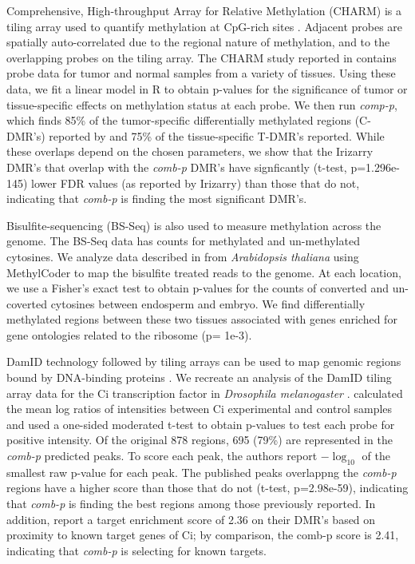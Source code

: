 \documentclass{bioinfo}
\begin{document}
\begin{methods}
Comprehensive, High-throughput Array for Relative Methylation (CHARM)
is a tiling array used to quantify methylation at CpG-rich sites
\citep{Irizarry2008}.  Adjacent probes are spatially auto-correlated
due to the regional nature of methylation, and to the overlapping
probes on the tiling array.  The CHARM study reported in
\cite{Irizarry2009} contains probe data for tumor and normal samples
from a variety of tissues. Using these data, we fit a linear model in R
\citep{R} to
obtain p-values for the significance of tumor or tissue-specific
effects on methylation status at each probe.  We then run
\textit{comp-p}, which finds 85\% of the tumor-specific differentially
methylated regions (C-DMR's) reported by \cite{Irizarry2009} and 75\% of
the tissue-specific T-DMR's reported.  While these overlaps depend on
the chosen parameters, we show that the Irizarry DMR's that overlap
with the \textit{comb-p} DMR's have signficantly (t-test,
p=1.296e-145) lower FDR values (as reported by Irizarry) than those
that do not, indicating that \textit{comb-p} is finding the most
significant DMR's.

Bisulfite-sequencing (BS-Seq) is also used to measure methylation across the
genome. The BS-Seq data
has counts for methylated and un-methylated cytosines.  We
analyze data described in \cite{Hsieh2009} from {\it Arabidopsis
thaliana} using MethylCoder \citep{Pedersen2011} to map the
bisulfite treated reads to the genome. At each location,
we use a Fisher's exact test to obtain p-values for the counts of
converted and un-coverted cytosines between endosperm and embryo. We find
differentially methylated regions between these two tissues associated
with genes enriched for gene ontologies related to the ribosome (p=
1e-3).

DamID technology followed by tiling arrays can be used to map genomic
regions bound by DNA-binding proteins \citep{Steensel2001}.  We
recreate an analysis of the DamID tiling array data for the Ci
transcription factor in {\it Drosophila melanogaster} \citep{Biehs}.
\cite{Kechris2010} calculated the
mean log ratios of intensities between Ci experimental and control
samples and used a one-sided moderated t-test \citep{Limma2005} to obtain
p-values to test each probe for positive intensity.
Of the original 878 regions, 695 (79\%) are
represented in the \textit{comb-p} predicted peaks.  To score each
peak, the authors report $-\log_{10}$ of the smallest raw p-value for
each peak. The published peaks overlappng the \textit{comb-p} regions
have a higher score than those that do not (t-test, p=2.98e-59),
indicating that \textit{comb-p}
is finding the best regions among those previously reported.
In addition,
\cite{Kechris2010} report a target enrichment score of 2.36 on their DMR's
based on proximity to known target genes of Ci; by comparison, the
comb-p score is 2.41, indicating that \textit{comb-p} is
selecting for known targets.

\end{methods}
\end{document}
